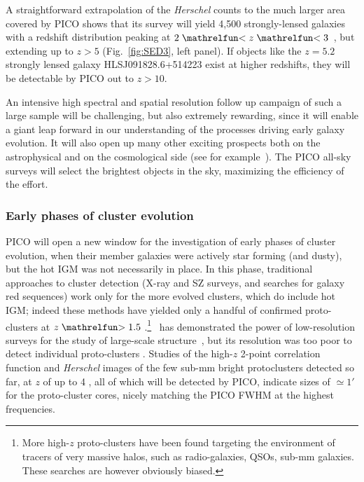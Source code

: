 \documentclass[PICOReport.tex]{subfiles}
\begin{document}
A straightforward extrapolation of the \textit{Herschel} counts to the much larger area covered by PICO shows that its survey will yield 4,500 strongly-lensed galaxies with a redshift distribution peaking at $2\simlt z \simlt 3$~\cite{Negrello2017lensed}, but extending up to $z> 5$ (Fig.~\ref{fig:SED3}, left panel). If objects like the $z=5.2$ strongly lensed galaxy HLSJ091828.6+514223 exist at higher redshifts, they will be detectable by PICO out to $z>10$.

An intensive high spectral and spatial resolution follow up campaign of such a large sample will be challenging, but also extremely rewarding, since it will enable a giant leap forward in our understanding of the processes driving early galaxy evolution. It will also open up many other exciting prospects both on the astrophysical and on the cosmological side (see for example~\citet{Treu2010}). The PICO all-sky surveys will select the brightest objects in the sky, maximizing the efficiency of the effort.

\subsubsection{Early phases of cluster evolution}

PICO will open a new window for the investigation of early phases of cluster evolution, when their member galaxies were actively star forming (and dusty), but the hot IGM was not necessarily in place. In this phase, traditional approaches to cluster detection (X-ray and SZ surveys, and searches for galaxy red sequences) work only for the more evolved clusters, which do include hot IGM; indeed these methods have yielded only a handful of confirmed proto-clusters at $z\simgt 1.5$ \cite{Overzier2016}.\footnote{More high-$z$ proto-clusters have been found targeting the environment of tracers of very massive halos, such as radio-galaxies, QSOs, sub-mm galaxies. These searches are however obviously biased.} \planck~has demonstrated the power of low-resolution surveys for the study of large-scale structure~\cite{Planck2016high_z}, but its resolution was too poor to detect individual proto-clusters \cite{Negrello2017protocl}.  Studies of the high-$z$ 2-point correlation function \cite{Chen2016, Negrello2017protocl} and \textit{Herschel} images of the few sub-mm bright protoclusters detected so far, at $z$ of up to 4 \cite{Ivison2013, Wang2016, Oteo2018}, all of which will be detected by PICO, indicate sizes of $\simeq 1'$ for the proto-cluster cores, nicely matching the PICO FWHM at the highest frequencies.
\end{document}

